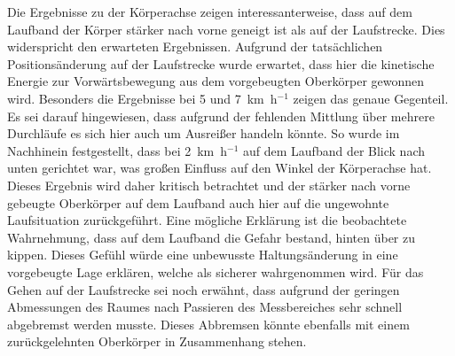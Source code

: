 Die Ergebnisse zu der Körperachse zeigen interessanterweise, dass auf dem Laufband der Körper stärker nach vorne geneigt ist als auf der Laufstrecke. Dies widerspricht den erwarteten Ergebnissen. Aufgrund der tatsächlichen Positionsänderung auf der Laufstrecke wurde erwartet, dass hier die kinetische Energie zur Vorwärtsbewegung aus dem vorgebeugten Oberkörper gewonnen wird. Besonders die Ergebnisse bei 5 und 7~km~h$^{-1}$ zeigen das genaue Gegenteil. Es sei darauf hingewiesen, dass aufgrund der fehlenden Mittlung über mehrere Durchläufe es sich hier auch um Ausreißer handeln könnte. So wurde im Nachhinein festgestellt, dass bei 2~km~h$^{-1}$ auf dem Laufband der Blick nach unten gerichtet war, was großen Einfluss auf den Winkel der Körperachse hat. Dieses Ergebnis wird daher kritisch betrachtet und der stärker nach vorne gebeugte Oberkörper auf dem Laufband auch hier auf die ungewohnte Laufsituation zurückgeführt. Eine mögliche Erklärung ist die beobachtete Wahrnehmung, dass auf dem Laufband die Gefahr bestand, hinten über zu kippen. Dieses Gefühl würde eine unbewusste Haltungsänderung in eine vorgebeugte Lage erklären, welche als sicherer wahrgenommen wird. Für das Gehen auf der Laufstrecke sei noch erwähnt, dass aufgrund der geringen Abmessungen des Raumes nach Passieren des Messbereiches sehr schnell abgebremst werden musste. Dieses Abbremsen könnte ebenfalls mit einem zurückgelehnten Oberkörper in Zusammenhang stehen.